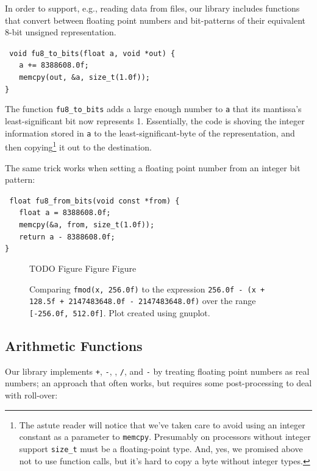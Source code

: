 \documentclass{acmsiggraph}
\theoremstyle{remark}
\theoremstyle{definition}
\begin{document}
In order to support, e.g., reading data from files, our library includes functions that convert between floating point numbers and bit-patterns of their equivalent 8-bit unsigned representation.

{\tt
void fu8\_to\_bits(float a, void *out) \{ \\
$\phantom{XX}$a += 8388608.0f; \\
$\phantom{XX}$memcpy(out, \&a, size\_t(1.0f)); \\
\}
}

The function {\tt fu8\_to\_bits} adds a large enough number to {\tt a} that its mantissa's least-significant bit now represents 1.
Essentially, the code is shoving the integer information stored in {\tt a} to the least-significant-byte of the representation, and then copying\footnote{
The astute reader will notice that we've taken care to avoid using an integer constant as a parameter to {\tt memcpy}.
Presumably on processors without integer support {\tt size\_t} must be a floating-point type.
And, yes, we promised above not to use function calls, but it's hard to copy a byte without integer types.
} it out to the destination.

The same trick works when setting a floating point number from an integer bit pattern:

{\tt
float fu8\_from\_bits(void const *from) \{ \\
$\phantom{XX}$float a = 8388608.0f; \\
$\phantom{XX}$memcpy(\&a, from, size\_t(1.0f)); \\
$\phantom{XX}$return a - 8388608.0f; \\
\}
}


\begin{figure}[tb!]
\huge TODO Figure Figure Figure
\caption{\label{fig-mod-graph} Comparing {\tt fmod(x, 256.0f)} to the expression {\tt 256.0f - (x + 128.5f + 2147483648.0f - 2147483648.0f)} over the range {\tt [-256.0f, 512.0f]}.
{\small Plot created using gnuplot.}}
\end{figure}

\subsection{Arithmetic Functions}
Our library implements {\tt +}, {\tt -}, {\tt *}, {\tt /}, and {\tt -} by treating floating point numbers as real numbers; an approach that often works, but requires some post-processing to deal with roll-over:
\end{document}
